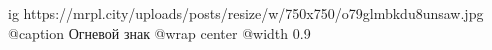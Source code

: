  
 
 
 
 

\ifcmt
  ig https://mrpl.city/uploads/posts/resize/w/750x750/o79glmbkdu8unsaw.jpg
	@caption Огневой знак
  @wrap center
  @width 0.9
\fi
